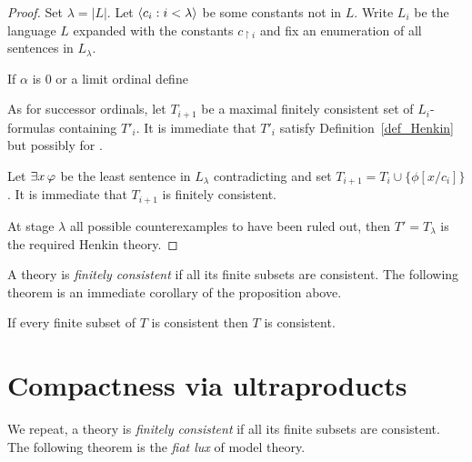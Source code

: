 \documentclass[creche.tex]{subfiles}
\begin{document}
\begin{proof} Set $\lambda=|L|$. Let $\langle c_i:i<\lambda\rangle$ be some constants not in $L$. Write $L_i$ be the language $L$ expanded with the constants $c_{\restriction i}$ and fix an enumeration of all sentences in $L_\lambda$. 

If $\alpha$ is $0$ or a limit ordinal define 


As for successor ordinals, let $T_{i+1}$ be a maximal finitely consistent set of $L_i$-formulas containing $T'_i$. It is immediate that $T'_i$ satisfy Definition~\ref{def_Henkin} but possibly for .

Let $\exists x\, \varphi$ be the least sentence in $L_\lambda$ contradicting  and set $T_{i+1}=T_i\cup\big\{\phi[x/c_i]\big\}$. It is immediate that $T_{i+1}$ is finitely consistent. 

At stage $\lambda$ all possible counterexamples to  have been ruled out, then $T'=T_\lambda$ is the required Henkin theory.
\end{proof}

A theory is \emph{finitely consistent\/} if all its finite subsets are consistent. The following theorem is an immediate corollary of the proposition above.

\begin{void_thm}
If every finite subset of $T$ is consistent then $T$ is consistent.\QED
\end{void_thm}



\section{Compactness via ultraproducts}\label{compactness_Ultra}
\def\medrel#1{\parbox[t]{6ex}{$\displaystyle\hfil #1$}}
\def\ceq#1#2#3{\parbox{25ex}{$\displaystyle #1$}\medrel{#2}$\displaystyle  #3$}



We repeat, a theory is \emph{finitely consistent\/} if all its finite subsets are consistent. The following theorem is the \textit{fiat lux\/} of model theory. 
\end{document}
